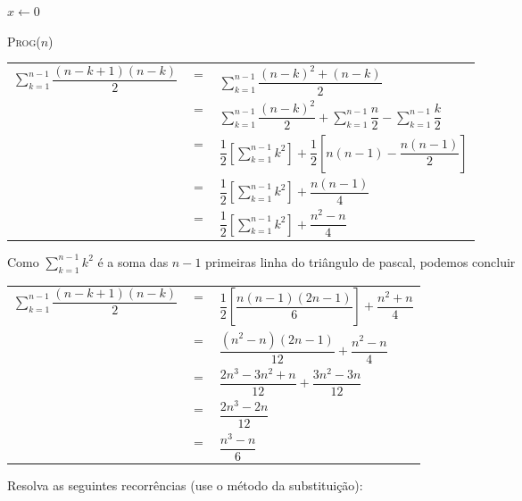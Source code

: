 \documentclass[a4paper]{exam}
\begin{document}
\begin{questions}
\begin{algorithm}[H]
    $x \gets 0$\;
    \caption{\textsc{Prog}($n$)}
  \end{algorithm}
  \begin{solution}
    \begin{tabular}{lll}
      $ \displaystyle\sum_{k=1}^{n-1} \dfrac{(n-k+1)(n-k)}{2} $&  $=$ &$ \displaystyle\sum_{k=1}^{n-1} \dfrac{(n-k)^2 + (n-k)}{2} $\\
      {}& $=$ &$ \displaystyle\sum_{k=1}^{n-1} \dfrac{(n-k)^2}{2} + \displaystyle\sum_{k=1}^{n-1}  \dfrac{n}{2} - \displaystyle\sum_{k=1}^{n-1} \dfrac{k}{2} $ \\
      {}& $=$ &$ \dfrac{1}{2}\left[ \displaystyle\sum_{k=1}^{n-1} k ^2 \right] + \dfrac{1}{2} \left[ n(n-1) - \dfrac{n(n-1)}{2} \right]  $\\ 
      {}& $=$ &$ \dfrac{1}{2} \left[ \displaystyle\sum_{k=1}^{n-1} k^2 \right] + \dfrac{n(n-1)}{4} $\\
      {}& $=$ &$ \dfrac{1}{2} \left[ \displaystyle\sum_{k=1}^{n-1} k^2 \right] + \dfrac{n^2 -n}{4} $\\
    \end{tabular}

      Como $\displaystyle\sum_{k=1}^{n-1} k^2 $ é a soma das $n-1$  primeiras linha do triângulo de pascal, podemos concluir

    \begin{tabular}{lll}
      $\displaystyle\sum_{k=1}^{n-1} \dfrac{(n-k+1)(n-k)}{2}$& $=$ &$\dfrac{1}{2} \left[ \dfrac{n(n-1)(2n-1)}{6}\right] + \dfrac{n^2 + n}{4} $\\
      {}& $=$ &$ \dfrac{(n^2 -n)(2n-1)}{12} + \dfrac{n^2 - n}{4}  $\\
      {}& $=$ &$ \dfrac{2n^3 - 3n^2 + n}{12} + \dfrac{3n^2 - 3n}{12}$\\
      {}& $=$ &$ \dfrac{2n^3- 2n}{12} $\\
      {}& $=$ &$ \dfrac{n^3 -n}{6} $\\
    \end{tabular}
  \end{solution}
  \question Resolva as seguintes recorrências (use o método da
  substituição):
\end{questions}
\end{document}
